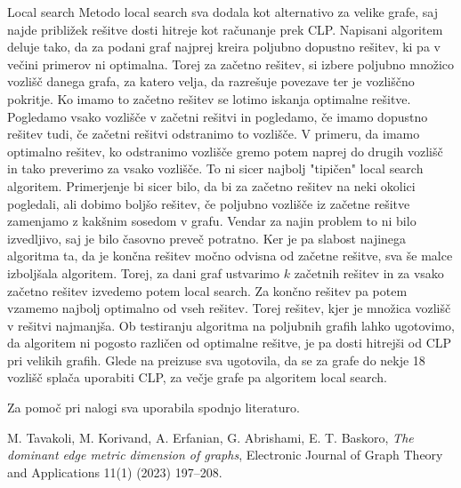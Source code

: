 \documentclass[12pt,a4paper]{amsart}
\makeatletter
\renewcommand\section{\@startsection{section}{1}%
  \z@{.5\linespacing\@plus.7\linespacing}{.5\linespacing}%
  {\normalfont\scshape\large\centering}}
\theoremstyle{plain} %
\makeatother
\begin{document}
\section{Local search}
    Metodo local search sva dodala kot alternativo za velike grafe, saj najde približek rešitve dosti hitreje kot 
    računanje prek CLP. Napisani algoritem deluje tako, da za podani graf najprej kreira poljubno dopustno rešitev, 
    ki pa v večini primerov ni optimalna. Torej za začetno rešitev, si izbere poljubno množico vozlišč danega grafa,
    za katero velja, da razrešuje povezave ter je vozliščno pokritje. Ko imamo to začetno rešitev se lotimo iskanja 
    optimalne rešitve. Pogledamo vsako vozlišče v začetni rešitvi in pogledamo, če imamo dopustno rešitev tudi, če 
    začetni rešitvi odstranimo to vozlišče. V primeru, da imamo optimalno rešitev, ko odstranimo vozlišče gremo potem 
    naprej do drugih vozlišč in tako preverimo za vsako vozlišče. To ni sicer najbolj "tipičen" local search algoritem.
    Primerjenje bi sicer bilo, da bi za začetno rešitev na neki okolici pogledali, ali dobimo boljšo rešitev, če poljubno
    vozlišče iz začetne rešitve zamenjamo z kakšnim sosedom v grafu. Vendar za najin problem to ni bilo izvedljivo, saj
    je bilo časovno preveč potratno. Ker je pa slabost najinega algoritma ta, da je končna rešitev močno odvisna od začetne
    rešitve, sva še malce izboljšala algoritem. Torej, za dani graf ustvarimo $k$ začetnih rešitev in za vsako začetno
    rešitev izvedemo potem local search. Za končno rešitev pa potem vzamemo najbolj optimalno od vseh rešitev. Torej
    rešitev, kjer je množica vozlišč v rešitvi najmanjša. Ob testiranju algoritma na poljubnih grafih lahko ugotovimo, 
    da algoritem ni pogosto različen od optimalne rešitve, je pa dosti hitrejši od CLP pri velikih grafih. 
    Glede na preizuse sva ugotovila, da se za grafe do nekje 18 vozlišč splača uporabiti CLP, za večje grafe pa algoritem local search.


\bigskip
Za pomoč pri nalogi sva uporabila spodnjo literaturo.
\begin{thebibliography}{99}
    M. Tavakoli, M. Korivand, A. Erfanian, G. Abrishami, E. T. Baskoro,
    \emph{The dominant edge metric dimension of graphs},
    Electronic Journal of Graph Theory and Applications 11(1) (2023) 197–208.  
\end{thebibliography}
\end{document}
